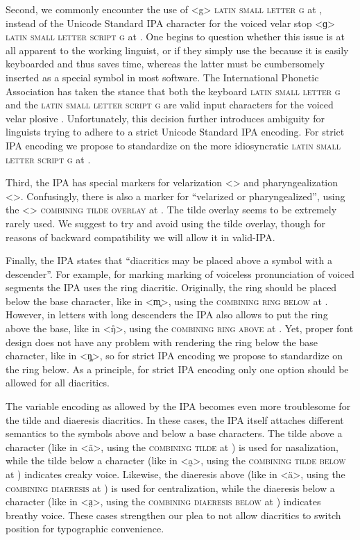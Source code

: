 
Second, we commonly encounter the use of <g> \textsc{latin small letter g} at
, instead of the Unicode Standard IPA character for the voiced velar
stop <ɡ> \textsc{latin small letter script g} at . One begins to
question whether this issue is at all apparent to the working linguist, or if
they simply use the  because it is easily keyboarded and thus saves
time, whereas the latter must be cumbersomely inserted as a special symbol in
most software. The International Phonetic Association has taken the stance that
both the keyboard \textsc{latin small letter g} and the \textsc{latin small
letter script g} are valid input characters for the voiced velar plosive \citep[19]{IPA1999}.
Unfortunately, this decision further introduces ambiguity for linguists trying
to adhere to a strict Unicode Standard IPA encoding. For strict IPA encoding we
propose to standardize on the more idiosyncratic \textsc{latin small letter
script g} at .

Third, the IPA has special markers for velarization <> and
pharyngealization <>. Confusingly, there is also a marker for
``velarized or pharyngealized'', using the <> \textsc{combining tilde
overlay} at . The tilde overlay seems to be extremely rarely used. We 
suggest to try and avoid using the tilde overlay, though for reasons of backward 
compatibility we will allow it in valid-IPA.\@

Finally, the IPA states that ``diacritics may be placed above a symbol with a
descender''. For example, for marking marking of voiceless pronunciation of
voiced segments the IPA uses the ring diacritic. Originally, the ring should be
placed below the base character, like in <m̥>, using the \textsc{combining ring
below} at . However, in letters with long descenders the IPA also
allows to put the ring above the base, like in <ŋ̊>, using the \textsc{combining
ring above} at . Yet, proper font design does not have any problem
with rendering the ring below the base character, like in <ŋ̥>, so for strict
IPA encoding we propose to standardize on the ring below. As a principle, for
strict IPA encoding only one option should be allowed for all diacritics.

The variable encoding as allowed by the IPA becomes even more troublesome for
the tilde and diaeresis diacritics. In these cases, the IPA itself attaches
different semantics to the symbols above and below a base characters. The tilde
above a character (like in <ã>, using the \textsc{combining tilde} at
) is used for nasalization, while the tilde below a character (like in
<a̰>, using the \textsc{combining tilde below} at ) indicates creaky
voice. Likewise, the diaeresis above (like in <ä>, using the \textsc{combining
diaeresis} at ) is used for centralization, while the diaeresis below
a character (like in <a̤>, using the \textsc{combining diaeresis below} at
) indicates breathy voice. These cases strengthen our plea to not
allow diacritics to switch position for typographic convenience.

